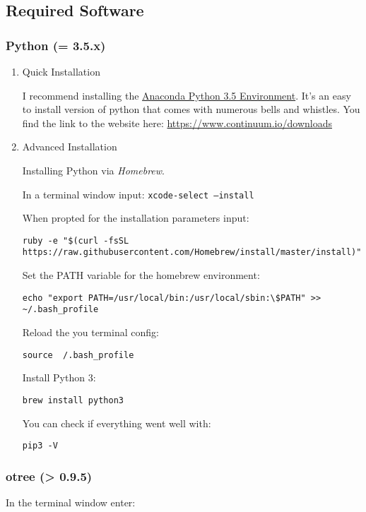 \documentclass[11pt]{article}
\newcommand{\maccode}[1]{{\footnotesize\color{black}\tt #1}}
\begin{document}
\subsection{Required Software}
\label{sec:orgheadline15}

\subsubsection{Python (= 3.5.x)}
\label{sec:orgheadline13}

\begin{enumerate}
\item Quick Installation
\label{sec:orgheadline11}

I recommend installing the \href{https://www.continuum.io/downloads}{Anaconda Python 3.5 Environment}. It's an easy to install version of python that comes with numerous bells and whistles.
You find the link to the website here: \url{https://www.continuum.io/downloads}

\item Advanced Installation
\label{sec:orgheadline12}

Installing Python via \emph{Homebrew}.

In a terminal window input: \maccode{xcode-select --install}

When propted for the installation parameters input:

\maccode{ruby -e "\$(curl -fsSL https://raw.githubusercontent.com/Homebrew/install/master/install)"}

Set the PATH variable for the homebrew environment:

\maccode{echo "export PATH=/usr/local/bin:/usr/local/sbin:\textbackslash\$PATH" >> \textasciitilde/.bash\_profile}

Reload the you terminal config:

\maccode{source ~/.bash_profile}

Install Python 3:

\maccode{brew install python3}

You can check if everything went well with:

\maccode{pip3 -V}
\end{enumerate}

\subsubsection{otree (> 0.9.5)}
\label{sec:orgheadline14}

In the terminal window enter: 
\end{document}
